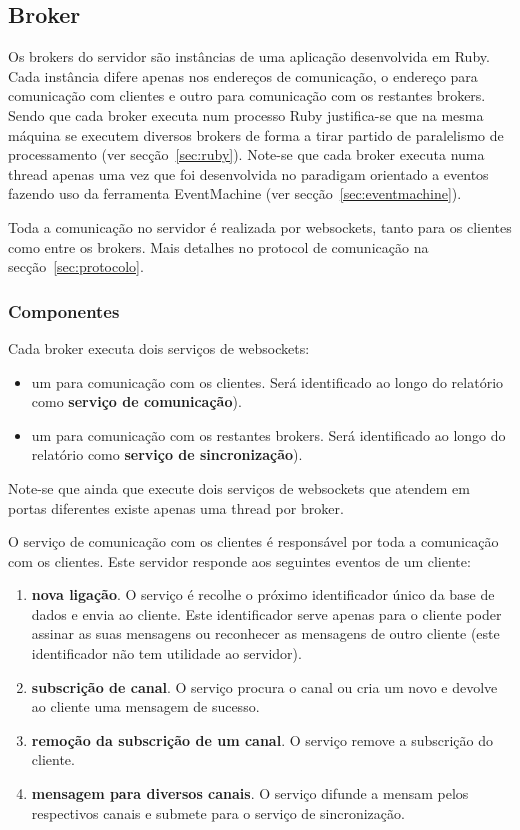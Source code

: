 \subsection{Broker}

Os brokers do servidor são instâncias de uma aplicação desenvolvida em Ruby. Cada instância difere apenas nos endereços de comunicação, o endereço para comunicação com clientes e outro para comunicação com os restantes brokers.
Sendo que cada broker executa num processo Ruby justifica-se que na mesma máquina se executem diversos brokers de forma a tirar partido de paralelismo de processamento (ver secção~\ref{sec:ruby}).
Note-se que cada broker executa numa thread apenas uma vez que foi desenvolvida no paradigam orientado a eventos fazendo uso da ferramenta EventMachine (ver secção~\ref{sec:eventmachine}).

Toda a comunicação no servidor é realizada por websockets, tanto para os clientes como entre os brokers. Mais detalhes no protocol de comunicação na secção~\ref{sec:protocolo}.

\subsubsection{Componentes}
Cada broker executa dois serviços de websockets:

\begin{itemize}
\item um para comunicação com os clientes. Será identificado ao longo do relatório como \textbf{serviço de comunicação}).
\item um para comunicação com os restantes brokers. Será identificado ao longo do relatório como \textbf{serviço de sincronização}).
\end{itemize}

Note-se que ainda que execute dois serviços de websockets que atendem em portas diferentes existe apenas uma thread por broker.

O serviço de comunicação com os clientes é responsável por toda a comunicação com os clientes. Este servidor responde aos seguintes eventos de um cliente:
\begin{enumerate}
\item \textbf{nova ligação}. O serviço é recolhe o próximo identificador único da base de dados e envia ao cliente. Este identificador serve apenas para o cliente poder assinar as suas mensagens ou reconhecer as mensagens de outro cliente (este identificador não tem utilidade ao servidor).
\item \textbf{subscrição de canal}. O serviço procura o canal ou cria um novo e devolve ao cliente uma mensagem de sucesso.
\item \textbf{remoção da subscrição de um canal}. O serviço remove a subscrição do cliente.
\item \textbf{mensagem para diversos canais}. O serviço difunde a mensam pelos respectivos canais e submete para o serviço de sincronização.
\end{enumerate}

